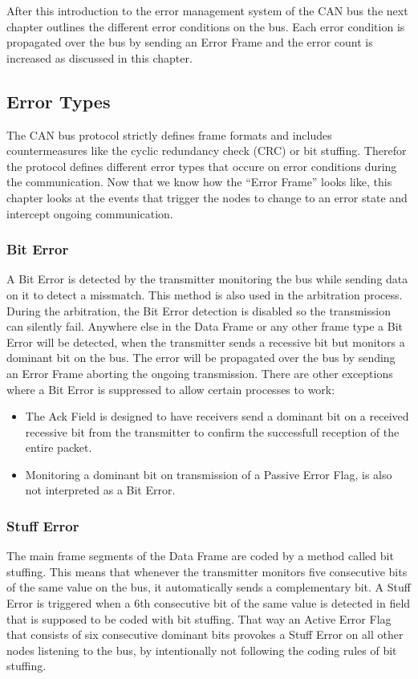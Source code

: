 	After this introduction to the error management system of the CAN bus the next
	chapter outlines the different error conditions on the bus. Each error
	condition is propagated over the bus by sending an Error Frame and the error
	count is increased as discussed in this chapter.
	
	\subsection{Error Types}
	The CAN bus protocol strictly defines frame formats and includes
	countermeasures like the cyclic redundancy check (CRC) or 
	bit stuffing. Therefor the protocol defines different error types that occure
	on error conditions during the communication. Now that we know how the ``Error Frame''
	looks like, this chapter looks at the events that trigger the nodes to change
	to an error state and intercept ongoing communication.
	
	\subsubsection{Bit Error} 
	A Bit Error is detected by the transmitter monitoring the bus
	while sending data on it to detect a missmatch. This method is also used in
	the arbitration process. During the
	arbitration, the Bit Error detection is disabled so the transmission can
	silently fail. Anywhere else in the Data Frame or any other frame type a
	Bit Error will be detected, when the transmitter sends a recessive bit but
	monitors a dominant bit on the bus. The error will be propagated over the bus
	by sending an Error Frame aborting the ongoing transmission. There are
	other exceptions where a Bit Error is suppressed to allow certain processes
	to work:
	\begin{itemize}
	  \item The Ack Field is designed to have receivers send a dominant bit on
	a received recessive bit from the transmitter to confirm the successfull
	reception of the entire packet.
	  \item Monitoring a
	  dominant bit on transmission of a Passive Error Flag, is also not
	  interpreted as a Bit Error.
	\end{itemize} 
	
	\subsubsection{Stuff Error}
	The main frame segments of the Data Frame are coded by a method called bit
	stuffing. This means that whenever the transmitter monitors five consecutive
	bits of the same value on the bus, it automatically sends a complementary bit.
	A Stuff Error is triggered when a 6th consecutive bit of the same value is
	detected in field that is supposed to be coded with bit stuffing. That way an
	Active Error Flag that consists of six consecutive dominant bits provokes a
	Stuff Error on all other nodes listening to the bus, by intentionally not
	following the coding rules of bit stuffing.
	
